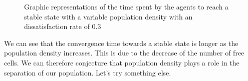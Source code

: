 \documentclass[a4paper, 12pt]{report}
\begin{document}
\begin{figure}[!h]
	\centering
\end{figure}
\begin{figure}[!h]
	\centering
	\caption{Graphic representations of the time spent by the agents to reach a stable state with a variable population density with an dissatisfaction rate of 0.3}
\end{figure}


We can see that the convergence time towards a stable state is longer as the population density increases. This is due to the decrease of the number of
free cells. We can therefore conjecture that population density plays a role in the separation of our population. Let's try something else.
\newpage
\end{document}

